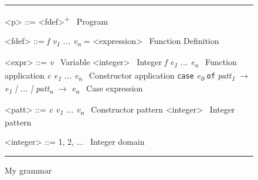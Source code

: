 \documentclass[diploma]{softlab-thesis}
\begin{document}
\begin{figure}[t]
\hrule
\begin{grammar}
    <p> ::= <fdef>\textsuperscript{+} \hfill\ Program

    <fdef> ::= \textit{f v\textsubscript{1} ... v\textsubscript{n}} = <expression> \hfill\ Function Definition

    <expr> ::= \textit{v} \hfill\ Variable
    \alt <integer> \hfill\ Integer
    \alt \textit{f e\textsubscript{1} ... e\textsubscript{n}} \hfill\ Function application
    \alt \textit{c e\textsubscript{1} ... e\textsubscript{n}} \hfill\ Constructor application
    \alt \texttt{case} \textit{e\textsubscript{0}} \texttt{of} \textit{patt\textsubscript{1} $\rightarrow$ e\textsubscript{1} | ... | patt\textsubscript{n} $\rightarrow$ e\textsubscript{n}} \hfill\ Case expression
     
    <patt> ::= \textit{c v\textsubscript{1} ... v\textsubscript{n}} \hfill\ Constructor pattern
    \alt <integer> \hfill\ Integer pattern

    <integer> ::= 1, 2, ... \hfill\ Integer domain

\end{grammar}
\hrule
\caption{My grammar\label{fig:grammar}}
\end{figure}
\end{document}
